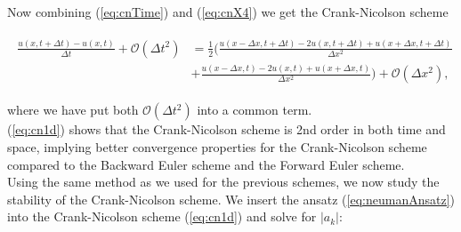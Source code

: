 \documentclass{article}
\begin{document}
Now combining (\ref{eq:cnTime}) and (\ref{eq:cnX4}) we get the Crank-Nicolson scheme

\begin{subequations}\label{eq:cn1d}
	\begin{align}
		\begin{split}
			\frac{u(x,t+\Delta t) - u(x,t)}{\Delta t} + \mathcal{O}(\Delta t^2)
			&= \frac{1}{2} \Big(\frac{u(x-\Delta x,t+ \Delta t)
			- 2u(x,t+\Delta t) +u(x+\Delta x,t+\Delta t)}{\Delta x^2} \\
			&+ \frac{u(x-\Delta x,t) - 2u(x,t) +u(x+ \Delta x,t)}{\Delta x^2} \Big) + \mathcal{O}(\Delta x^2),
		\end{split}
	\end{align}
\end{subequations}

where we have put both $\mathcal{O}(\Delta t^2)$ into a common term.\\

(\ref{eq:cn1d}) shows that the Crank-Nicolson scheme is 2nd order in both time and space, implying better convergence properties for the Crank-Nicolson scheme compared to the Backward Euler scheme and the Forward Euler scheme.\\

Using the same method as we used for the previous schemes, we  now study the stability of the Crank-Nicolson scheme. We insert the ansatz (\ref{eq:neumanAnsatz}) into the Crank-Nicolson scheme (\ref{eq:cn1d}) and solve for $|a_k|$:
\end{document}
